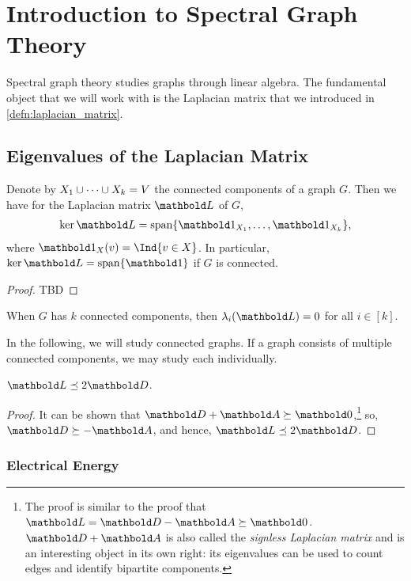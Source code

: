 
\chapter{Introduction to Spectral Graph Theory}

Spectral graph theory studies graphs through linear algebra. The fundamental object that we will work with is the Laplacian matrix that we introduced in \cref{defn:laplacian_matrix}.

\section{Eigenvalues of the Laplacian Matrix}

\begin{lem}
Denote by $X_1 \cup \dots \cup X_k = V$ the connected components of a graph $G$. Then we have for the Laplacian matrix $\mL$ of $G$, \begin{align}
    \ker{\mL} = \vspan\{\vOne_{\sX_1}, \dots, \vOne_{\sX_k}\},
\end{align} where $\vOne_{\sX}(v) = \Ind{v \in \sX}$. In particular, $\ker{\mL} = \vspan\{\vOne\}$ if $G$ is connected.
\end{lem}
\begin{proof}
TBD
\end{proof}
\begin{cor}
When $G$ has $k$ connected components, then $\lambda_i(\mL) = 0$ for all $i \in [k]$.
\end{cor}

In the following, we will study connected graphs. If a graph consists of multiple connected components, we may study each individually.

\begin{lem}
$\mL \preceq 2\mD$.
\end{lem}
\begin{proof} It can be shown that $\mD + \mA \succeq \mZero$,\footnote{The proof is similar to the proof that $\mL = \mD - \mA \succeq \mZero$. $\mD + \mA$ is also called the \emph{signless Laplacian matrix} and is an interesting object in its own right: its eigenvalues can be used to count edges and identify bipartite components.} so, $\mD \succeq -\mA$, and hence, $\mL \preceq 2\mD$.
\end{proof}

\subsection{Electrical Energy}

